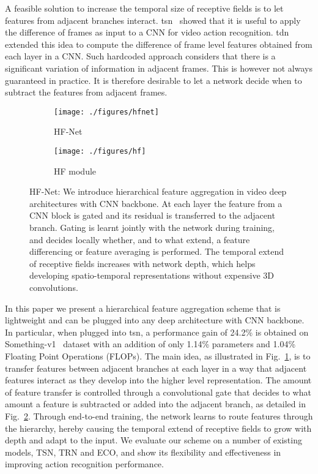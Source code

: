 \documentclass[journal,onecolumn]{IEEEtran}
\begin{document}
A feasible solution to increase the temporal size of receptive fields is to let features from adjacent branches interact. \ac{tsn}~\cite{tsn} showed that it is useful to apply the difference of frames as input to a CNN for video action recognition. \ac{tdn}~\cite{tdn} extended this idea to compute the difference of frame level features obtained from each layer in a CNN. Such hardcoded approach considers that there is a significant variation of information in adjacent frames. This is however not always guaranteed in practice. It is therefore desirable to let a network decide when to subtract the features from adjacent frames.



\begin{figure}
    \centering
    \begin{subfigure}[b]{0.35\textwidth}
		\texttt{[image: ./figures/hfnet]}
		\caption{HF-Net}
		\label{fig:hfnet} 
	\end{subfigure} \hspace{3cm}
	\begin{subfigure}[b]{0.3\textwidth}
		\texttt{[image: ./figures/hf]}
		\caption{HF module}
		\label{fig:hfmod}
	\end{subfigure}
	\caption{HF-Net: We introduce hierarchical feature aggregation in video deep architectures with CNN backbone. At each layer the feature from a CNN block is gated and its residual is transferred to the adjacent branch. Gating is learnt jointly with the network during training, and decides locally whether, and to what extend, a feature differencing or feature averaging is performed. The temporal extend of receptive fields increases with network depth, which helps developing spatio-temporal representations without expensive 3D convolutions.}
	\label{fig:basic_block}
\end{figure}

In this paper we present a hierarchical feature aggregation scheme that is lightweight and can be plugged into any deep architecture with CNN backbone. In particular, when plugged into \ac{tsn}, a performance gain of 24.2\% is obtained on Something-v1~\cite{goyal2017something} dataset with an addition of only 1.14\% parameters and 1.04\% Floating Point Operations (FLOPs). The main idea, as illustrated in Fig.~\ref{fig:hfnet}, is to transfer features between adjacent branches at each layer in a way that adjacent features interact as they develop into the higher level representation. The amount of feature transfer is controlled through a convolutional gate that decides to what amount a feature is subtracted or added into the adjacent branch, as detailed in Fig.~\ref{fig:hfmod}. Through end-to-end training, the network learns to route features through the hierarchy, hereby causing the temporal extend of receptive fields to grow with depth and adapt to the input. We evaluate our scheme on a number of existing models, TSN, TRN and ECO, and show its flexibility and effectiveness in improving action recognition performance.
\end{document}
